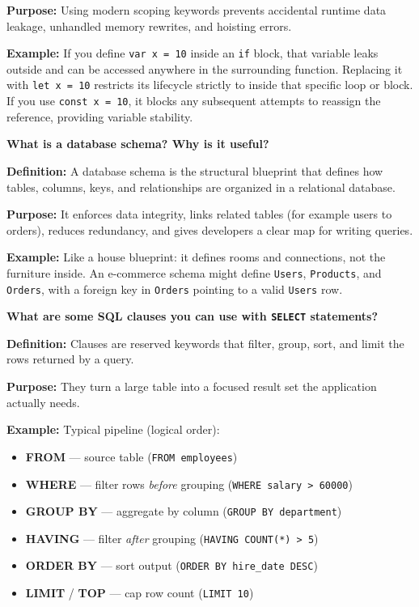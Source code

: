 \textbf{Purpose:} Using modern scoping keywords prevents accidental runtime data leakage, unhandled memory rewrites, and hoisting errors.

\textbf{Example:} If you define \texttt{var x = 10} inside an \texttt{if} block, that variable leaks outside and can be accessed anywhere in the surrounding function. Replacing it with \texttt{let x = 10} restricts its lifecycle strictly to inside that specific loop or block. If you use \texttt{const x = 10}, it blocks any subsequent attempts to reassign the reference, providing variable stability.

\newpage


\question[0]
\textbf{What is a database schema? Why is it useful?}

\textbf{Definition:} A database schema is the structural blueprint that defines how tables, columns, keys, and relationships are organized in a relational database.

\textbf{Purpose:} It enforces data integrity, links related tables (for example users to orders), reduces redundancy, and gives developers a clear map for writing queries.

\textbf{Example:} Like a house blueprint: it defines rooms and connections, not the furniture inside. An e-commerce schema might define \texttt{Users}, \texttt{Products}, and \texttt{Orders}, with a foreign key in \texttt{Orders} pointing to a valid \texttt{Users} row.

\question[0]
\textbf{What are some SQL clauses you can use with \texttt{SELECT} statements?}

\textbf{Definition:} Clauses are reserved keywords that filter, group, sort, and limit the rows returned by a query.

\textbf{Purpose:} They turn a large table into a focused result set the application actually needs.

\textbf{Example:} Typical pipeline (logical order):
\begin{itemize}
  \item \textbf{FROM} --- source table (\texttt{FROM employees})
  \item \textbf{WHERE} --- filter rows \emph{before} grouping (\texttt{WHERE salary > 60000})
  \item \textbf{GROUP BY} --- aggregate by column (\texttt{GROUP BY department})
  \item \textbf{HAVING} --- filter \emph{after} grouping (\texttt{HAVING COUNT(*) > 5})
  \item \textbf{ORDER BY} --- sort output (\texttt{ORDER BY hire\_date DESC})
  \item \textbf{LIMIT} / \textbf{TOP} --- cap row count (\texttt{LIMIT 10})
\end{itemize}

